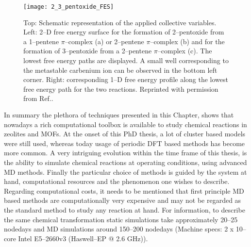 \begin{figure}[!htp]
	\centering
	\texttt{[image: 2\_3\_pentoxide\_FES]}
	\caption[Top: Schematic representation of the applied collective variables.
	Left: 2--D free energy surface for the formation of 2--pentoxide from a
	1--pentene $\pi$--complex (a) or 2--pentene $\pi$--complex (b) and for the formation
	of 3--pentoxide from a 2--pentene $\pi$--complex (c). The lowest free energy paths
	are displayed. A small well corresponding to the metastable carbenium ion can be observed in the bottom left corner.
Right: corresponding 1--D free energy profile along the lowest free energy path
for the two reactions.]{Top: Schematic representation of the applied collective variables.
	Left: 2--D free energy surface for the formation of 2--pentoxide from a
	1--pentene $\pi$--complex (a) or 2--pentene $\pi$--complex (b) and for the formation
	of 3--pentoxide from a 2--pentene $\pi$--complex (c). The lowest free energy paths
	are displayed. A small well corresponding to the metastable carbenium ion can be observed in the bottom left corner.
Right: corresponding 1--D free energy profile along the lowest free energy path
for the two reactions. Reprinted with permission from Ref.\cite{Hajek2016}.}
	\label{fig:2_3_pentoxide_FES}
\end{figure}
\npar
\newpage
In summary the plethora of techniques presented in this Chapter, shows that
nowadays a rich computational toolbox is available to study chemical reactions in zeolites and MOFs.
At the onset of this PhD thesis, a lot of cluster based models were still used, 
whereas today usage of periodic DFT based methods has become more common.  
A very intriguing evolution within the time frame of this thesis, is the ability
to simulate chemical reactions at operating conditions, using advanced MD
methods. Finally the particular choice of methods is guided by the system at
hand, computational resources and the phenomenon one wishes to describe.
Regarding computational costs, it needs to be mentioned that first principle MD
based methods are computationally very expensive and may not be regarded as the standard method to study any reaction at hand. 
For information, to describe the same chemical transformation static simulations
take approximately 20--25 nodedays and MD simulations around 150--200 nodedays
(Machine specs: 2 x 10--core Intel E5--2660v3 (Haswell--EP @ 2.6 GHz)).



\clearpage{\pagestyle{empty}\cleardoublepage}






